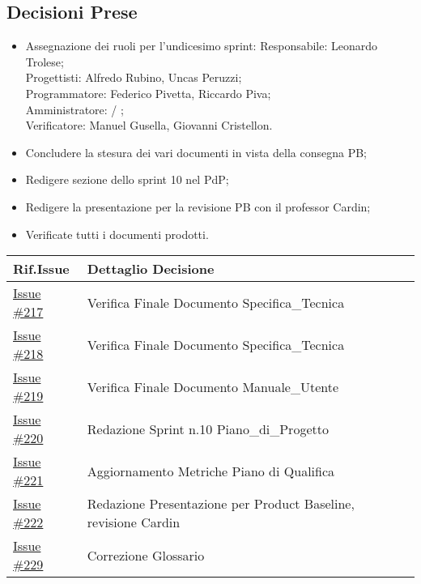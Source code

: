 \documentclass[10pt]{article}
\begin{document}
\subsection{Decisioni Prese}
    \begin{itemize}
        \item   Assegnazione dei ruoli per l'undicesimo sprint:
                Responsabile: Leonardo Trolese;\\
                Progettisti: Alfredo Rubino, Uncas Peruzzi;\\
                Programmatore: Federico Pivetta, Riccardo Piva;\\
                Amministratore: / ;\\
                Verificatore: Manuel Gusella, Giovanni Cristellon.
        \item Concludere la stesura dei vari documenti in vista della consegna PB;
        \item Redigere sezione dello sprint 10 nel PdP;
        \item Redigere la presentazione per la revisione PB con il professor Cardin;
        \item Verificate tutti i documenti prodotti.
    \end{itemize}
    \begin{center}
    \begin{tabular}{|>{\centering\arraybackslash}m{3cm}|>{\centering\arraybackslash}m{12cm}|}
	\hline
	\textbf{Rif.Issue} & \textbf{Dettaglio Decisione}\\
	\hline
            \href{https://github.com/SevenBitsSwe/7BitsDocs/issues/217}{Issue \#217} & Verifica Finale Documento Specifica_Tecnica\\
            \href{https://github.com/SevenBitsSwe/7BitsDocs/issues/218}{Issue \#218} & Verifica Finale Documento Specifica_Tecnica\\
            \href{https://github.com/SevenBitsSwe/7BitsDocs/issues/219}{Issue \#219} & Verifica Finale Documento Manuale_Utente\\
            \href{https://github.com/SevenBitsSwe/7BitsDocs/issues/220}{Issue \#220} & Redazione Sprint n.10 Piano_di_Progetto\\
            \href{https://github.com/SevenBitsSwe/7BitsDocs/issues/221}{Issue \#221} & Aggiornamento Metriche Piano di Qualifica\\
            \href{https://github.com/SevenBitsSwe/7BitsDocs/issues/222}{Issue \#222} & Redazione Presentazione per Product Baseline, revisione Cardin\\
            \href{https://github.com/SevenBitsSwe/7BitsDocs/issues/229}{Issue \#229} & Correzione Glossario\\
        \hline
    \end{tabular}
    \end{center}
\end{document}
